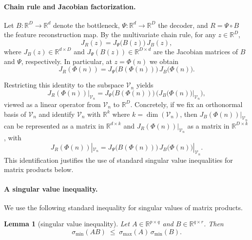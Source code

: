 \documentclass{article}
\theoremstyle{plain}
\newtheorem{lemma}[theorem]{Lemma}
\theoremstyle{definition}
\theoremstyle{remark}
\begin{document}
\paragraph{Chain rule and Jacobian factorization.}
Let $B:\mathbb{R}^D\to\mathbb{R}^d$ denote the bottleneck,
$\Psi:\mathbb{R}^d\to\mathbb{R}^D$ the decoder, and
$R = \Psi\circ B$ the feature reconstruction map. By the multivariate
chain rule, for any $z\in\mathbb{R}^D$,
\begin{equation}
    J_R(z) = J_\Psi\big(B(z)\big)\, J_B(z),
\end{equation}
where $J_B(z)\in\mathbb{R}^{d\times D}$ and
$J_\Psi(B(z))\in\mathbb{R}^{D\times d}$ are the Jacobian matrices of
$B$ and $\Psi$, respectively. In particular, at $z = \Phi(n)$ we obtain
\begin{equation}
    J_R(\Phi(n)) = J_\Psi\big(B(\Phi(n))\big)\, J_B\big(\Phi(n)\big).
\end{equation}

Restricting this identity to the subspace $\mathcal{V}_n$ yields
\begin{equation}
    J_R(\Phi(n))\big|_{\mathcal{V}_n}
    = J_\Psi\big(B(\Phi(n))\big)\,
      \Big(J_B\big(\Phi(n)\big)\big|_{\mathcal{V}_n}\Big),
\end{equation}
viewed as a linear operator from $\mathcal{V}_n$ to $\mathbb{R}^D$.
Concretely, if we fix an orthonormal basis of $\mathcal{V}_n$ and
identify $\mathcal{V}_n$ with $\mathbb{R}^k$ where
$k = \dim(\mathcal{V}_n)$, then $J_B(\Phi(n))|_{\mathcal{V}_n}$ can be
represented as a matrix in $\mathbb{R}^{d\times k}$ and
$J_R(\Phi(n))|_{\mathcal{V}_n}$ as a matrix in $\mathbb{R}^{D\times k}$,
with
\begin{equation}
    J_R(\Phi(n))|_{\mathcal{V}_n}
    =
    J_\Psi\big(B(\Phi(n))\big)\,
    J_B\big(\Phi(n)\big)|_{\mathcal{V}_n}.
\end{equation}
This identification justifies the use of standard singular value
inequalities for matrix products below.

\paragraph{A singular value inequality.}
We use the following standard inequality for singular values of matrix
products.

\begin{lemma}[singular value inequality]\label{lem:sv_ineq}
Let $A\in\mathbb{R}^{p\times q}$ and $B\in\mathbb{R}^{q\times r}$.
Then
\begin{equation}
    \sigma_{\min}(AB) \;\le\;
    \sigma_{\max}(A)\, \sigma_{\min}(B).
\end{equation}
\end{lemma}
\end{document}
